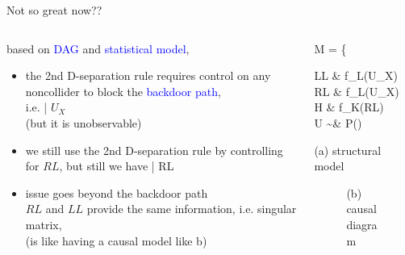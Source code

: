 \begin{frame}
	{Not so great now??}
	\begin{columns}
		\begin{column}{0.5\textwidth}
			based on \textcolor{blue}{DAG} and \textcolor{blue}{statistical model},
			\begin{itemize}
				\item the 2nd D-separation rule requires control on any noncollider to block the \textcolor{blue}{backdoor path}, \\
				i.e.  \; | $U_{X}$ \\
				{\small (but it is unobservable)}
				\item we still use the 2nd D-separation rule by controlling for $RL$, but still we have  \; | RL \\
				\item issue goes beyond the backdoor path \\
				$RL$ and $LL$ provide the same information, i.e. singular matrix, \\
				{\small (is like having a causal model like b) }
			\end{itemize}
		\end{column}
		\begin{column}{0.5\textwidth}  
			\begin{equ}
				M = \left\{ \begin{aligned} 
					LL \leftarrow & \; f_{L}(U_{X}) \\
					RL \leftarrow & \; f_{L}(U_{X}) \\
					H \leftarrow & \; f_{K}(RL) \\
					U \sim & \; P()
				\end{aligned} \right
				\caption*{(a) structural model}
			\end{equ}
			\begin{figure}
				\caption*{(b) causal diagram}
			\end{figure}
		\end{column}
	\end{columns}
\end{frame}
